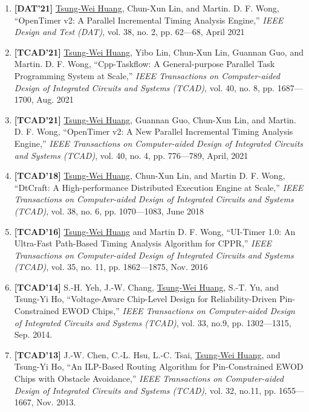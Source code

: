 \documentclass[A4,11pt]{article}
\begin{document}
\begin{enumerate}
  \item \textbf{[DAT'21]} \underline{Tsung-Wei Huang}, Chun-Xun Lin, and Martin. D. F. Wong, ``OpenTimer v2: A Parallel Incremental Timing Analysis Engine,'' \textit{IEEE Design and Test (DAT)}, vol. 38, no. 2, pp. 62—68, April 2021

  \item \textbf{[TCAD'21]} \underline{Tsung-Wei Huang}, Yibo Lin, Chun-Xun Lin, Guannan Guo, and Martin. D. F. Wong, ``Cpp-Taskflow: A General-purpose Parallel Task Programming System at Scale,'' \textit{IEEE Transactions on Computer-aided Design of Integrated Circuits and Systems (TCAD)}, vol. 40, no. 8, pp. 1687—1700, Aug. 2021

  \item \textbf{[TCAD'21]} \underline{Tsung-Wei Huang}, Guannan Guo, Chun-Xun Lin, and Martin. D. F. Wong, ``OpenTimer v2: A New Parallel Incremental Timing Analysis Engine,'' \textit{IEEE Transactions on Computer-aided Design of Integrated Circuits and Systems (TCAD)}, vol. 40, no. 4, pp. 776—789, April, 2021

  \item \textbf{[TCAD'18]} \underline{Tsung-Wei Huang}, Chun-Xun Lin, and Martin D. F. Wong, ``DtCraft: A High-performance Distributed Execution Engine at Scale,'' \textit{IEEE Transactions on Computer-aided Design of Integrated Circuits and Systems (TCAD)}, vol. 38, no. 6, pp. 1070—1083, June 2018

  \item \textbf{[TCAD'16]} \underline{Tsung-Wei Huang} and Martin D. F. Wong, ``UI-Timer 1.0: An Ultra-Fast Path-Based Timing Analysis Algorithm for CPPR,'' \textit{IEEE Transactions on Computer-aided Design of Integrated Circuits and Systems (TCAD)}, vol. 35, no. 11, pp. 1862—1875, Nov. 2016

  \item \textbf{[TCAD'14]} S.-H. Yeh, J.-W. Chang, \underline{Tsung-Wei Huang}, S.-T. Yu, and Tsung-Yi Ho, ``Voltage-Aware Chip-Level Design for Reliability-Driven Pin-Constrained EWOD Chips,'' \textit{IEEE Transactions on Computer-aided Design of Integrated Circuits and Systems (TCAD)}, vol. 33, no.9, pp. 1302—1315, Sep. 2014. 

  \item \textbf{[TCAD'13]} J.-W. Chen, C.-L. Hsu, L.-C. Tsai, \underline{Tsung-Wei Huang}, and Tsung-Yi Ho, ``An ILP-Based Routing Algorithm for Pin-Constrained EWOD Chips with Obstacle Avoidance,'' \textit{IEEE Transactions on Computer-aided Design of Integrated Circuits and Systems (TCAD)}, vol. 32, no.11, pp. 1655—1667, Nov. 2013.


\end{enumerate}
\end{document}
